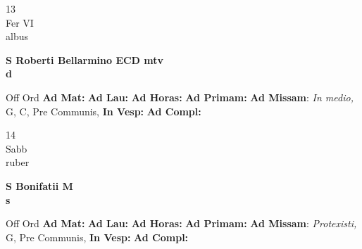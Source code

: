 \documentclass[10pt, openany]{book}
\begin{document}
        \begin{center}
            \begin{minipage}{3.5in}
                \vspace{2em}
                \begin{minipage}{0.5in}
                    {\Huge 13} \\
                    {\normalsize Fer VI} \\
                    {\normalsize albus}
                \end{minipage}
                \begin{minipage}{3.0in}
                    \textbf{ \large S Roberti Bellarmino ECD mtv \\
                    \textnormal{\normalsize d}} \\ 
                \end{minipage}
                \begin{justify}Off Ord
                    \textbf{Ad Mat: }
                    \textbf{Ad Lau: }
                    \textbf{Ad Horas: }
                    \textbf{Ad Primam: }\textbf{Ad Missam}: \textit{In medio,} G, C, Pre Communis,  
                    \textbf{In Vesp: }
                    \textbf{Ad Compl: }
                \end{justify}
            \end{minipage}
        \end{center}
    
        \begin{center}
            \begin{minipage}{3.5in}
                \vspace{2em}
                \begin{minipage}{0.5in}
                    {\Huge 14} \\
                    {\normalsize Sabb} \\
                    {\normalsize ruber}
                \end{minipage}
                \begin{minipage}{3.0in}
                    \textbf{ \large S Bonifatii M \\
                    \textnormal{\normalsize s}} \\ 
                \end{minipage}
                \begin{justify}Off Ord
                    \textbf{Ad Mat: }
                    \textbf{Ad Lau: }
                    \textbf{Ad Horas: }
                    \textbf{Ad Primam: }\textbf{Ad Missam}: \textit{Protexisti,} G, Pre Communis,  
                    \textbf{In Vesp: }
                    \textbf{Ad Compl: }
                \end{justify}
            \end{minipage}
        \end{center}
    
\end{document}
